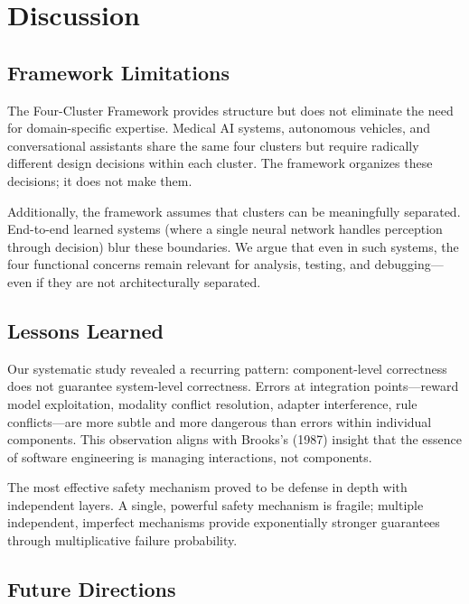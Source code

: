 \documentclass[11pt,a4paper]{article}
\begin{document}
\section{Discussion}

\subsection{Framework Limitations}

The Four-Cluster Framework provides structure but does not eliminate the need for domain-specific expertise. Medical AI systems, autonomous vehicles, and conversational assistants share the same four clusters but require radically different design decisions within each cluster. The framework organizes these decisions; it does not make them.

Additionally, the framework assumes that clusters can be meaningfully separated. End-to-end learned systems (where a single neural network handles perception through decision) blur these boundaries. We argue that even in such systems, the four functional concerns remain relevant for analysis, testing, and debugging---even if they are not architecturally separated.

\subsection{Lessons Learned}

Our systematic study revealed a recurring pattern: component-level correctness does not guarantee system-level correctness. Errors at integration points---reward model exploitation, modality conflict resolution, adapter interference, rule conflicts---are more subtle and more dangerous than errors within individual components. This observation aligns with Brooks's (1987) insight that the essence of software engineering is managing interactions, not components.

The most effective safety mechanism proved to be defense in depth with independent layers. A single, powerful safety mechanism is fragile; multiple independent, imperfect mechanisms provide exponentially stronger guarantees through multiplicative failure probability.

\subsection{Future Directions}
\end{document}
